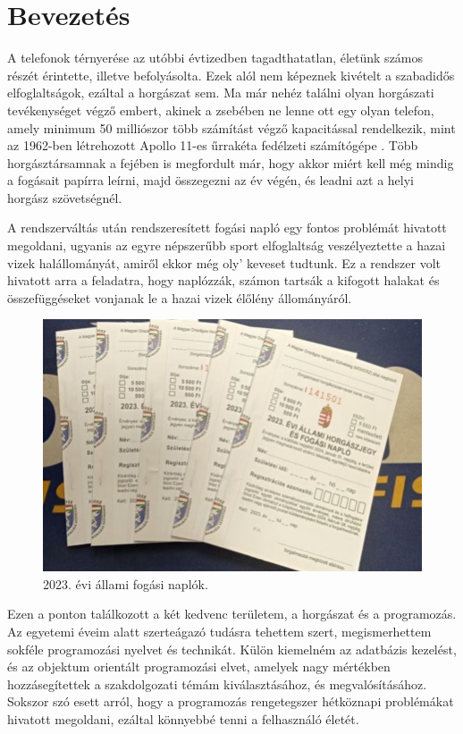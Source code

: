 \chapter{Bevezetés}

A telefonok térnyerése az utóbbi évtizedben tagadthatatlan, életünk számos részét érintette,
illetve befolyásolta. Ezek alól nem képeznek kivételt a szabadidős elfoglaltságok, ezáltal
a horgászat sem. Ma már nehéz találni olyan horgászati tevékenységet végző embert, akinek a zsebében
ne lenne ott egy olyan telefon, amely minimum 50 milliószor több számítást végző kapacitással rendelkezik,
mint az 1962-ben létrehozott Apollo 11-es űrrakéta fedélzeti számítógépe \cite{realclearscience}. Több horgásztársamnak a fejében
is megfordult már, hogy akkor miért kell még mindig a fogásait papírra leírni, majd összegezni az év végén, 
és leadni azt a helyi horgász szövetségnél.

A rendszerváltás után rendszeresített fogási napló egy fontos problémát hivatott megoldani, ugyanis az 
egyre népszerűbb sport elfoglaltság veszélyeztette a hazai vizek halállományát, amiről ekkor még oly' keveset tudtunk.
Ez a rendszer volt hivatott arra a feladatra, hogy naplózzák, számon tartsák a kifogott halakat és összefüggéseket vonjanak le a hazai vizek élőlény állományáról.

\begin{figure}[h]
\centering
\includegraphics[scale=0.3]{images/fogasi_naplo.jpg}
\caption{2023. évi állami fogási naplók.}
\label{fig:fogasinaplok}
\end{figure}

Ezen a ponton találkozott a két kedvenc területem, a horgászat és a programozás. 
Az egyetemi éveim alatt szerteágazó tudásra tehettem szert, megismerhettem sokféle programozási nyelvet és
technikát. Külön kiemelném az adatbázis kezelést, és az objektum orientált programozási elvet, amelyek
nagy mértékben hozzásegítettek a szakdolgozati témám kiválasztásához, és megvalósításához.
Sokszor szó esett arról, hogy a programozás rengetegszer hétköznapi problémákat hivatott megoldani, ezáltal
könnyebbé tenni a felhasználó életét. 

